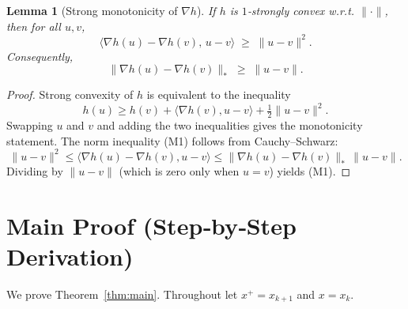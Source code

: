 \documentclass{article}
\newtheorem{lemma}{Lemma}
\begin{document}
\begin{lemma}[Strong monotonicity of $\nabla h$]\label{lem:monotone}
If $h$ is $1$‑strongly convex w.r.t. $\|\cdot\|$, then for all $u,v$,
\[
\langle\nabla h(u)-\nabla h(v),\,u-v\rangle\;\ge\;\|u-v\|^{2}.
\]
Consequently,
\[
\|\nabla h(u)-\nabla h(v)\|_{*}\;\ge\;\|u-v\|.
\tag{M1}
\]
\end{lemma}
\begin{proof}
Strong convexity of $h$ is equivalent to the inequality
\[
h(u)\ge h(v)+\langle\nabla h(v),u-v\rangle+\tfrac12\|u-v\|^{2}.
\]
Swapping $u$ and $v$ and adding the two inequalities gives the monotonicity statement. The norm inequality (M1) follows from Cauchy–Schwarz:
\[
\|u-v\|^{2}\le\langle\nabla h(u)-\nabla h(v),u-v\rangle
\le\|\nabla h(u)-\nabla h(v)\|_{*}\,\|u-v\|.
\] 
Dividing by $\|u-v\|$ (which is zero only when $u=v$) yields (M1). \hfill\qedsymbol
\end{proof}

\section*{Main Proof (Step‑by‑Step Derivation)}
We prove Theorem~\ref{thm:main}.  Throughout let $x^{+}=x_{k+1}$ and $x=x_k$.
\end{document}
